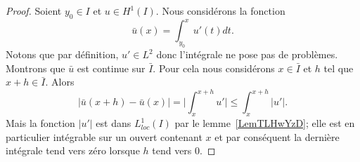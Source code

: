 \begin{proof}
    Soient \( y_0\in I\) et \( u\in H^1(I)\). Nous considérons la fonction
    \begin{equation}
        \bar u(x)=\int_{y_0}^xu'(t)dt.
    \end{equation}
    Notons que par définition, \( u'\in L^2\) donc l'intégrale ne pose pas de problèmes. Montrons que \( \bar u\) est continue sur \( \bar I\). Pour cela nous considérons \( x\in\bar I\) et \( h\) tel que \( x+h\in \bar I\). Alors
    \begin{equation}
        \big| \bar u(x+h)-\bar u(x) \big|=\big| \int_x^{x+h}u' \big|\leq \int_x^{x+h}| u' |.
    \end{equation}
    Mais la fonction \( | u' |\) est dans \( L^1_{loc}(I)\) par le lemme~\ref{LemTLHwYzD}; elle est en particulier intégrable sur un ouvert contenant \( x\) et par conséquent la dernière intégrale tend vers zéro lorsque \( h\) tend vers \( 0\).


\end{proof}
